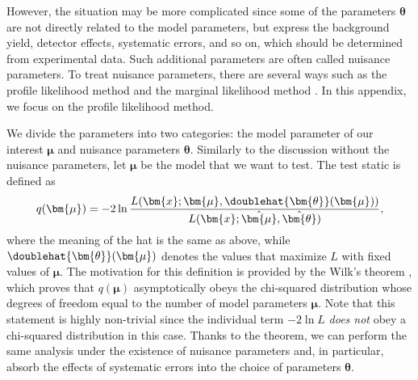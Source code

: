 \documentclass[12pt,twoside,book]{article}
\begin{document}
However, the situation may be more complicated since some of the parameters $\bm{\theta}$ are not directly related to the model parameters, but express the background yield, detector effects, systematic errors, and so on, which should be determined from experimental data.
Such additional parameters are often called nuisance parameters.
To treat nuisance parameters, there are several ways such as the profile likelihood method \cite{Cowan:2010js} and the marginal likelihood method \cite{10.1007/978-3-642-57489-4_11}.
In this appendix, we focus on the profile likelihood method.

We divide the parameters into two categories: the model parameter of our interest $\bm{\mu}$ and nuisance parameters $\bm{\theta}$.
Similarly to the discussion without the nuisance parameters, let $\bm{\mu}$ be the model that we want to test.
The test static is defined as
\begin{align}
  q (\bm{\mu}) =
  -2 \ln \frac{L(\bm{x} ; \bm{\mu}, \doublehat{\bm{\theta}} (\bm{\mu}))}
  {L(\bm{x} ; \hat{\bm{\mu}}, \hat{\bm{\theta}})},
\end{align}
where the meaning of the hat is the same as above, while $\doublehat{\bm{\theta}} (\bm{\mu})$ denotes the values that maximize $L$ with fixed values of $\bm{\mu}$.
The motivation for this definition is provided by the Wilk's theorem \cite{wilks1938}, which proves that $q (\bm{\mu})$ asymptotically obeys the chi-squared distribution whose degrees of freedom equal to the number of model parameters $\bm{\mu}$.
Note that this statement is highly non-trivial since the individual term $-2\ln L$ \textit{does not} obey a chi-squared distribution in this case.
Thanks to the theorem, we can perform the same analysis under the existence of nuisance parameters and, in particular, absorb the effects of systematic errors into the choice of parameters $\bm{\theta}$.


% 
% 
\end{document}
